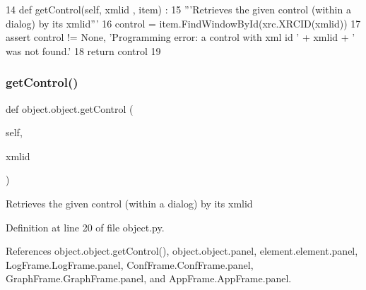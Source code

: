 \begin{DoxyCode}
14     \textcolor{keyword}{def }getControl(self, xmlid , item) :
15         \textcolor{stringliteral}{'''Retrieves the given control (within a dialog) by its xmlid'''}
16         control = item.FindWindowById(xrc.XRCID(xmlid))
17         \textcolor{keyword}{assert} control != \textcolor{keywordtype}{None}, \textcolor{stringliteral}{'Programming error: a control with xml id '} + xmlid + \textcolor{stringliteral}{' was not found.'}
18         \textcolor{keywordflow}{return} control
19 
\end{DoxyCode}
\mbox{\label{classobject_1_1object_a22a9d1ff67cd6e990cf1b63ed49c50e4}} 
\subsubsection{\texorpdfstring{get\+Control()}{getControl()}\hspace{0.1cm}{\footnotesize\ttfamily [2/2]}}
{\footnotesize\ttfamily def object.\+object.\+get\+Control (\begin{DoxyParamCaption}\item[{}]{self,  }\item[{}]{xmlid }\end{DoxyParamCaption})\hspace{0.3cm}{\ttfamily [inherited]}}

\begin{DoxyVerb}Retrieves the given control (within a dialog) by its xmlid\end{DoxyVerb}
 

Definition at line 20 of file object.\+py.



References object.\+object.\+get\+Control(), object.\+object.\+panel, element.\+element.\+panel, Log\+Frame.\+Log\+Frame.\+panel, Conf\+Frame.\+Conf\+Frame.\+panel, Graph\+Frame.\+Graph\+Frame.\+panel, and App\+Frame.\+App\+Frame.\+panel.



